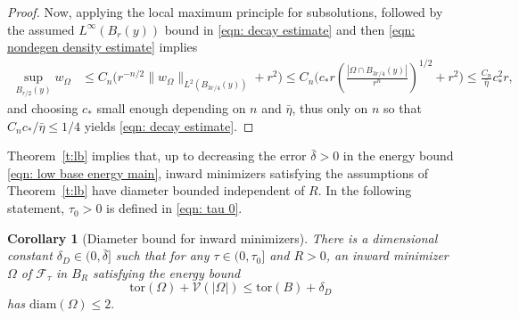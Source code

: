 \documentclass[10pt, reqno]{amsart}
\numberwithin{equation}{section}
\newtheorem{corollary}[theorem]{Corollary}
\def\W{\Omega}
\def\tor{\mathrm{tor}}
\def\vo{\mathscr{V}}
\def\err{\tau}
\def\Ep{\mathcal{F}_{\err}}
\def\ccdel{\bar{\delta}}
\begin{document}
\begin{proof}
Now, applying the local maximum principle for subsolutions, followed by the assumed $L^\infty(B_r(y))$ bound in \eqref{eqn: decay estimate} and then \eqref{eqn: nondegen density estimate}  implies
	\begin{align*}
		\label{eqn: loc max p}
	\sup_{B_{r/2}(y)} w_\W  & \leq C_n \big(r^{-n/2} \| w_\W\|_{L^2(B_{3r/4}(y))} +r^2\big)
 \leq C_n \Big( c_* r \left( \frac{|\W\cap B_{3r/4}(y)|}{r^n}\right)^{1/2}   + r^2\Big) \leq \frac{C_n}{\bar\eta} c_*^2 r,
	\end{align*}
and choosing $c_*$ small enough depending on $n$ and $\bar\eta$, thus only on $n$ so that $C_n c_*/\bar\eta \leq 1/4$ yields \eqref{eqn: decay estimate}. 
\end{proof}
%
%
%
%
%
% 
Theorem~\ref{t:lb} implies that, up to decreasing the error $\bar{\delta}>0$ in the energy bound \eqref{eqn: low base energy main}, inward minimizers satisfying the assumptions of Theorem~\ref{t:lb} have diameter bounded independent of $R$. In the following statement, $\tau_0>0$ is defined in \eqref{eqn: tau 0}.
%
%
%
%
\begin{corollary}[Diameter bound for inward minimizers]\label{cor: diameter bound}
There  is a  dimensional constant  $\delta_{D} \in (0, \ccdel]$
 such that for any $\tau \in (0,\tau_0]$ and 
$R>0$, an inward minimizer $\W$  of $\Ep$ in $B_R$ satisfying the energy bound
\begin{equation}\label{eqn: low energy for diam bound}
    \tor(\W) + \vo(|\W|) \leq \tor(B) + \delta_D\,
 \end{equation}   
has  $\text{diam}(\W) \leq 2.$
\end{corollary}
%
%
%
%
\end{document}
